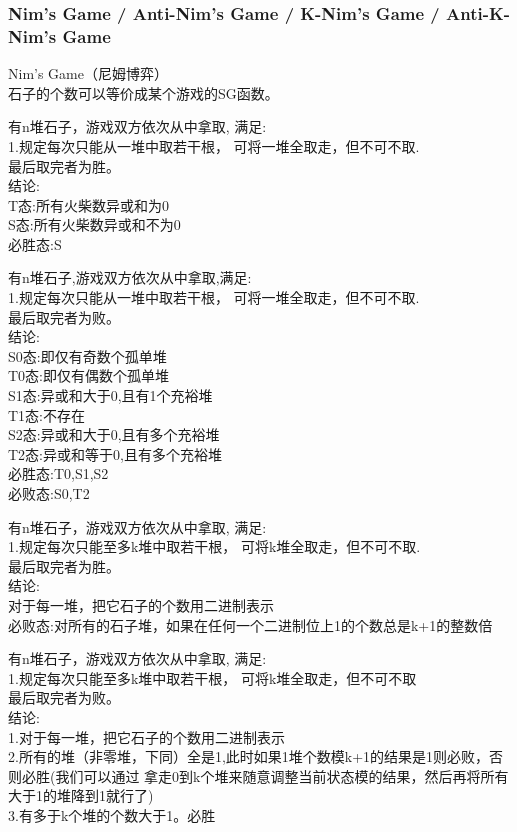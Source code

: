 \documentclass[10pt]{ctexart}
\begin{document}
{{\subsubsection{Nim’s Game / Anti-Nim's Game / K-Nim's Game / Anti-K-Nim's Game}
Nim’s Game（尼姆博弈）\\
石子的个数可以等价成某个游戏的SG函数。\\
\par
有n堆石子，游戏双方依次从中拿取, 满足:\\
1.规定每次只能从一堆中取若干根， 可将一堆全取走，但不可不取.\\
最后取完者为胜。\\
结论:\\
T态:所有火柴数异或和为0\\
S态:所有火柴数异或和不为0\\
必胜态:S\\
\par
有n堆石子,游戏双方依次从中拿取,满足:\\
1.规定每次只能从一堆中取若干根， 可将一堆全取走，但不可不取.\\
最后取完者为败。\\
结论:\\
S0态:即仅有奇数个孤单堆\\
T0态:即仅有偶数个孤单堆\\
S1态:异或和大于0,且有1个充裕堆\\
T1态:不存在\\
S2态:异或和大于0,且有多个充裕堆\\
T2态:异或和等于0,且有多个充裕堆\\
必胜态:T0,S1,S2\\
必败态:S0,T2\\
\par
有n堆石子，游戏双方依次从中拿取, 满足:\\
1.规定每次只能至多k堆中取若干根， 可将k堆全取走，但不可不取.\\
最后取完者为胜。\\
结论:\\
对于每一堆，把它石子的个数用二进制表示\\
必败态:对所有的石子堆，如果在任何一个二进制位上1的个数总是k+1的整数倍\\
\par
有n堆石子，游戏双方依次从中拿取, 满足:\\
1.规定每次只能至多k堆中取若干根， 可将k堆全取走，但不可不取\\
最后取完者为败。\\
结论:\\
1.对于每一堆，把它石子的个数用二进制表示\\
2.所有的堆（非零堆，下同）全是1,此时如果1堆个数模k+1的结果是1则必败，否则必胜(我们可以通过 拿走0到k个堆来随意调整当前状态模的结果，然后再将所有大于1的堆降到1就行了)\\
3.有多于k个堆的个数大于1。必胜\\
}}
\end{document}
